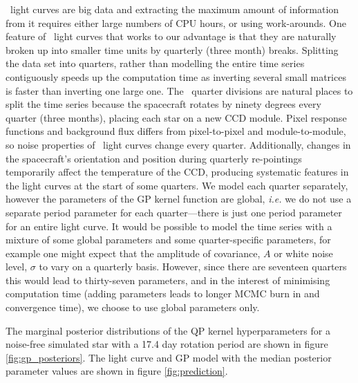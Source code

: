 \kepler\ light curves are big data and extracting the maximum amount of
information from it requires either large numbers of CPU hours, or using
work-arounds.
One feature of \kepler\ light curves that works to our advantage is that they
are naturally broken up into smaller time units by quarterly (three month)
breaks.
Splitting the data set into quarters, rather than modelling the entire time
series contiguously speeds up the computation time as inverting several
small matrices is faster than inverting one large one.
The \kepler\ quarter divisions are natural places to split the time series
because the spacecraft rotates by ninety degrees every quarter (three months),
placing each star on a new CCD module.
Pixel response functions and background flux differs from pixel-to-pixel and
module-to-module, so noise properties of \kepler\ light curves change every
quarter.
Additionally, changes in the spacecraft's orientation and position during
quarterly re-pointings temporarily affect the temperature of the CCD,
producing systematic features in the light curves at the start of some
quarters.
We model each quarter separately, however the parameters of the GP kernel
function are global, {\it i.e.} we do not use a separate period parameter for
each quarter---there is just one period parameter for an entire light curve.
It would be possible to model the time series with a mixture of some global
parameters and some quarter-specific parameters, for example one might expect
that the amplitude of covariance, $A$ or white noise level, $\sigma$ to vary
on a quarterly basis.
However, since there are seventeen quarters this would lead to thirty-seven
parameters, and in the interest of minimising computation time (adding
parameters leads to longer MCMC burn in and convergence time), we choose to
use global parameters only.

The marginal posterior distributions of the QP kernel hyperparameters for a
noise-free simulated star with a 17.4 day rotation period are shown in figure
\ref{fig:gp_posteriors}.
The light curve and GP model with the median posterior parameter values are
shown in figure \ref{fig:prediction}.

